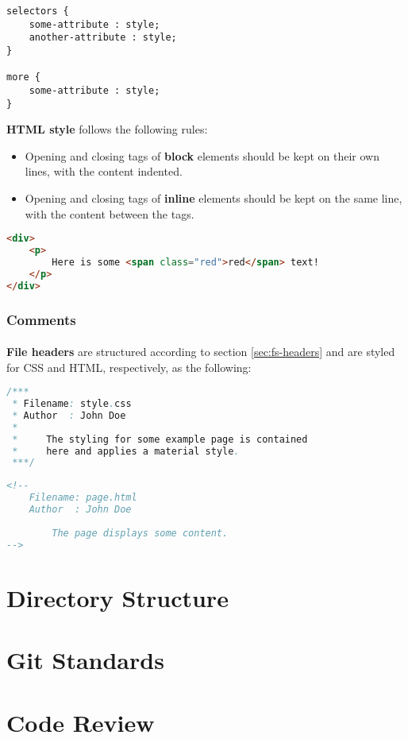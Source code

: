 \documentclass{article}
\begin{document}
    \begin{lstlisting}
selectors {
    some-attribute : style;
    another-attribute : style;
}

more {
    some-attribute : style;
}
    \end{lstlisting}

    \textbf{HTML style} follows the following rules:

    \begin{itemize}
        \item Opening and closing tags of \textbf{block} elements should be kept
            on their own lines, with the content indented.
        \item Opening and closing tags of \textbf{inline} elements should be
            kept on the same line, with the content between the tags.
    \end{itemize}

    \begin{lstlisting}[language=html]
<div>
    <p>
        Here is some <span class="red">red</span> text!
    </p>
</div>
    \end{lstlisting}

    \subsubsection{Comments}
    \label{sec:ls-html-com}

    \paragraph{}
    \textbf{File headers} are structured according to section
    \ref{sec:fs-headers} and are styled for CSS and HTML, respectively, as
    the following:

    \begin{lstlisting}[language=java]
/***
 * Filename: style.css
 * Author  : John Doe
 *
 *     The styling for some example page is contained
 *     here and applies a material style.
 ***/
    \end{lstlisting}

    \begin{lstlisting}[language=html]
<!--
    Filename: page.html
    Author  : John Doe
    
        The page displays some content.
-->
    \end{lstlisting}

    \newpage

    \section{Directory Structure}
    \label{sec:ds}

    \newpage

    \section{Git Standards}
    \label{sec:gs}

    \newpage

    \section{Code Review}
    \label{sec:cr}
\end{document}
